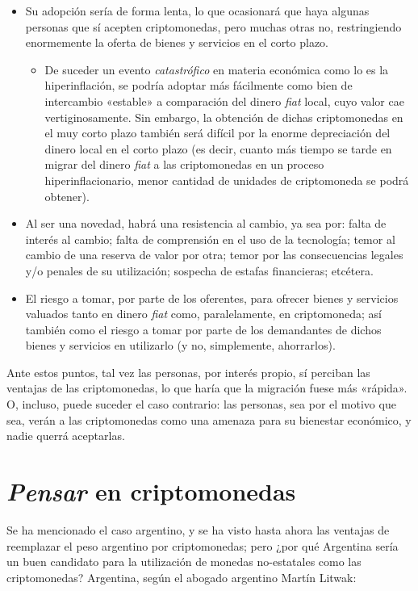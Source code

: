 \documentclass[12pt,a4paper,twoside]{book}
\begin{document}
\begin{itemize}
\item Su adopción sería de forma lenta, lo que ocasionará que haya algunas personas que sí acepten criptomonedas, pero muchas otras no, restringiendo enormemente la oferta de bienes y servicios en el corto plazo.
	\begin{itemize}
		\item De suceder un evento \textit{catastrófico} en materia económica como lo es la hiperinflación, se podría adoptar más fácilmente como bien de intercambio «estable» a comparación del dinero \textit{fiat} local, cuyo valor cae vertiginosamente. Sin embargo, la obtención de dichas criptomonedas en el muy corto plazo también será difícil por la enorme depreciación del dinero local en el corto plazo (es decir, cuanto más tiempo se tarde en migrar del dinero \textit{fiat} a las criptomonedas en un proceso hiperinflacionario, menor cantidad de unidades de criptomoneda se podrá obtener).
	\end{itemize}
\item Al ser una novedad, habrá una resistencia al cambio, ya sea por: falta de interés al cambio; falta de comprensión en el uso de la tecnología; temor al cambio de una reserva de valor por otra; temor por las consecuencias legales y/o penales de su utilización; sospecha de estafas financieras; etcétera.
\item El riesgo a tomar, por parte de los oferentes, para ofrecer bienes y servicios valuados tanto en dinero \textit{fiat} como, paralelamente, en criptomoneda; así también como el riesgo a tomar por parte de los demandantes de dichos bienes y servicios en utilizarlo (y no, simplemente, ahorrarlos).
\end{itemize}

Ante estos puntos, tal vez las personas, por interés propio, sí perciban las ventajas de las criptomonedas, lo que haría que la migración fuese más «rápida». O, incluso, puede suceder el caso contrario: las personas, sea por el motivo que sea, verán a las criptomonedas como una amenaza para su bienestar económico, y nadie querrá aceptarlas.

\section{\textit{Pensar} en criptomonedas}
Se ha mencionado el caso argentino, y se ha visto hasta ahora las ventajas de reemplazar el peso argentino por criptomonedas; pero ¿por qué Argentina sería un buen candidato para la utilización de monedas no-estatales como las criptomonedas? Argentina, según el abogado argentino Martín Litwak:
\end{document}
